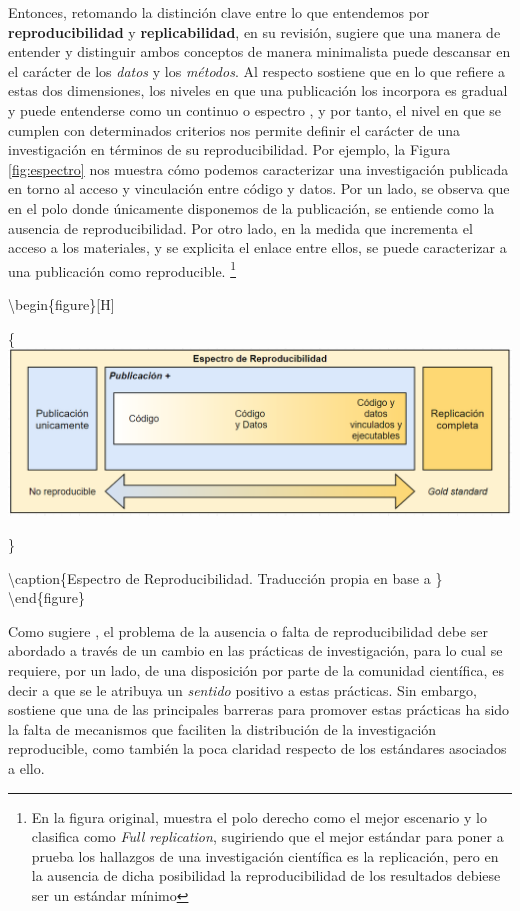 \documentclass[
]{book}
\begin{document}
Entonces, retomando la distinción clave entre lo que entendemos por \textbf{reproducibilidad} y \textbf{replicabilidad}, en su revisión, \citet{barba_Terminologies_2018} sugiere que una manera de entender y distinguir ambos conceptos de manera minimalista puede descansar en el carácter de los \emph{datos} y los \emph{métodos}. Al respecto \citet{nosek_Promoting_2015} sostiene que en lo que refiere a estas dos dimensiones, los niveles en que una publicación los incorpora es gradual y puede entenderse como un continuo o espectro \citep{peng_Reproducible_2011}, y por tanto, el nivel en que se cumplen con determinados criterios nos permite definir el carácter de una investigación en términos de su reproducibilidad. Por ejemplo, la Figura \ref{fig:espectro} nos muestra cómo podemos caracterizar una investigación publicada en torno al acceso y vinculación entre código y datos. Por un lado, se observa que en el polo donde únicamente disponemos de la publicación, se entiende como la ausencia de reproducibilidad. Por otro lado, en la medida que incrementa el acceso a los materiales, y se explicita el enlace entre ellos, se puede caracterizar a una publicación como reproducible. \footnote{En la figura original, \citet{peng_Reproducible_2011} muestra el polo derecho como el mejor escenario y lo clasifica como \emph{Full replication}, sugiriendo que el mejor estándar para poner a prueba los hallazgos de una investigación científica es la replicación, pero en la ausencia de dicha posibilidad la reproducibilidad de los resultados debiese ser un estándar mínimo}

\textbackslash begin\{figure\}{[}H{]}

\{\centering \includegraphics[width=0.75\linewidth]{docs/images/repro-spectrum}

\}

\textbackslash caption\{Espectro de Reproducibilidad. Traducción propia en base a \citet{peng_Reproducible_2011} \}\label{fig:espectro}
\textbackslash end\{figure\}

Como sugiere \citet{nosek_Promoting_2015}, el problema de la ausencia o falta de reproducibilidad debe ser abordado a través de un cambio en las prácticas de investigación, para lo cual se requiere, por un lado, de una disposición por parte de la comunidad científica, es decir a que se le atribuya un \emph{sentido} positivo a estas prácticas. Sin embargo, \citet{peng_Reproducible_2011} sostiene que una de las principales barreras para promover estas prácticas ha sido la falta de mecanismos que faciliten la distribución de la investigación reproducible, como también la poca claridad respecto de los estándares asociados a ello.
\end{document}

